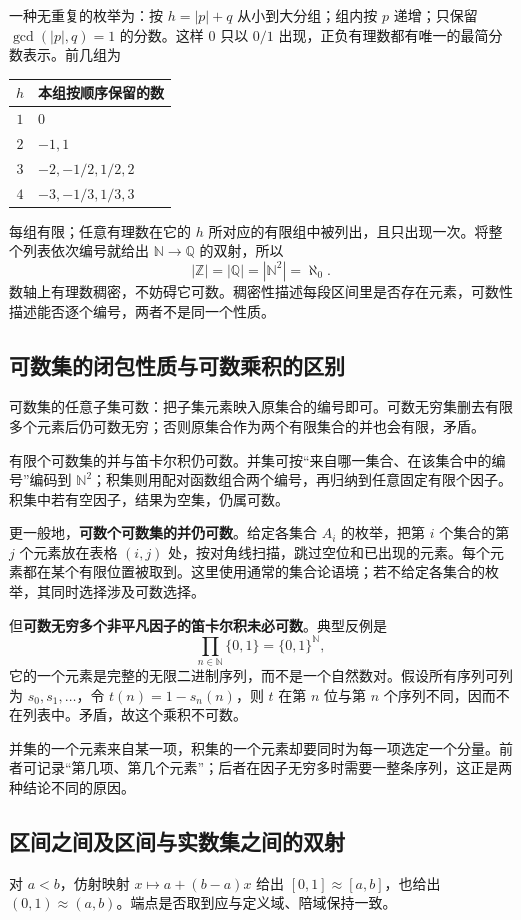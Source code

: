 \documentclass[UTF8,fontset=none,zihao=-4,a4paper]{ctexart}
\newcommand{\term}[1]{\textbf{#1}}
\begin{document}
一种无重复的枚举为：按 $h=|p|+q$ 从小到大分组；组内按 $p$ 递增；只保留 $\gcd(|p|,q)=1$ 的分数。这样 $0$ 只以 $0/1$ 出现，正负有理数都有唯一的最简分数表示。前几组为
\begin{center}
\begin{tabular}{c l}
\toprule $h$ & 本组按顺序保留的数\\\midrule
$1$ & $0$\\
$2$ & $-1,1$\\
$3$ & $-2,-1/2,1/2,2$\\
$4$ & $-3,-1/3,1/3,3$\\\bottomrule
\end{tabular}
\end{center}
每组有限；任意有理数在它的 $h$ 所对应的有限组中被列出，且只出现一次。将整个列表依次编号就给出 $\mathbb N\to\mathbb Q$ 的双射，所以
\[
|\mathbb Z|=|\mathbb Q|=|\mathbb N^2|=\aleph_0.
\]
数轴上有理数稠密，不妨碍它可数。稠密性描述每段区间里是否存在元素，可数性描述能否逐个编号，两者不是同一个性质。

\subsection{可数集的闭包性质与可数乘积的区别}
可数集的任意子集可数：把子集元素映入原集合的编号即可。可数无穷集删去有限多个元素后仍可数无穷；否则原集合作为两个有限集合的并也会有限，矛盾。

有限个可数集的并与笛卡尔积仍可数。并集可按“来自哪一集合、在该集合中的编号”编码到 $\mathbb N^2$；积集则用配对函数组合两个编号，再归纳到任意固定有限个因子。积集中若有空因子，结果为空集，仍属可数。

更一般地，\term{可数个可数集的并仍可数}。给定各集合 $A_i$ 的枚举，把第 $i$ 个集合的第 $j$ 个元素放在表格 $(i,j)$ 处，按对角线扫描，跳过空位和已出现的元素。每个元素都在某个有限位置被取到。这里使用通常的集合论语境；若不给定各集合的枚举，其同时选择涉及可数选择。

但\term{可数无穷多个非平凡因子的笛卡尔积未必可数}。典型反例是
\[
\prod_{n\in\mathbb N}\{0,1\}=\{0,1\}^{\mathbb N},
\]
它的一个元素是完整的无限二进制序列，而不是一个自然数对。假设所有序列可列为 $s_0,s_1,\ldots$，令 $t(n)=1-s_n(n)$，则 $t$ 在第 $n$ 位与第 $n$ 个序列不同，因而不在列表中。矛盾，故这个乘积不可数。

并集的一个元素来自某一项，积集的一个元素却要同时为每一项选定一个分量。前者可记录“第几项、第几个元素”；后者在因子无穷多时需要一整条序列，这正是两种结论不同的原因。

\subsection{区间之间及区间与实数集之间的双射}
对 $a<b$，仿射映射 $x\mapsto a+(b-a)x$ 给出 $[0,1]\approx[a,b]$，也给出 $(0,1)\approx(a,b)$。端点是否取到应与定义域、陪域保持一致。
\end{document}
